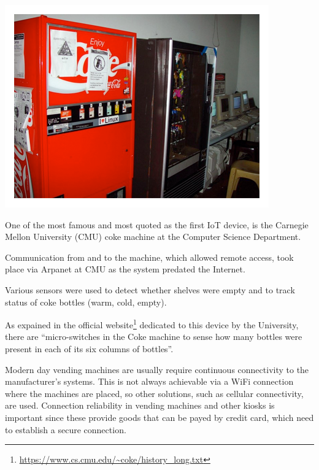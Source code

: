 		\noindent
		\begin{minipage}{0.5\textwidth}%
			\centering
			\includegraphics[width=\textwidth]{resources/img/coke}
		\end{minipage}%
		\hfill%
		\begin{minipage}{0.5\textwidth}\raggedright
			One of the most famous and most quoted as the first IoT device, is the Carnegie Mellon University (CMU) coke machine at the Computer Science Department.

			Communication from and to the machine, which allowed remote access, took place via Arpanet at CMU as the system predated the Internet.
		\end{minipage}
		\newline
		
		Various sensors were used to detect whether shelves were empty and to track status of coke bottles (warm, cold, empty).
		
		As expained in the official website\footnote{\url{https://www.cs.cmu.edu/~coke/history_long.txt}} dedicated to this device by the University, there are ``micro-switches in the Coke machine to sense how many bottles were present in each of its six columns of bottles''.
	
		Modern day vending machines are usually require continuous connectivity to the manufacturer's systems.
		This is not always achievable via a WiFi connection where the machines are placed, so other solutions, such as cellular connectivity, are used.
		Connection reliability in vending machines and other kiosks is important since these provide goods that can be payed by credit card, which need to establish a secure connection.
		
